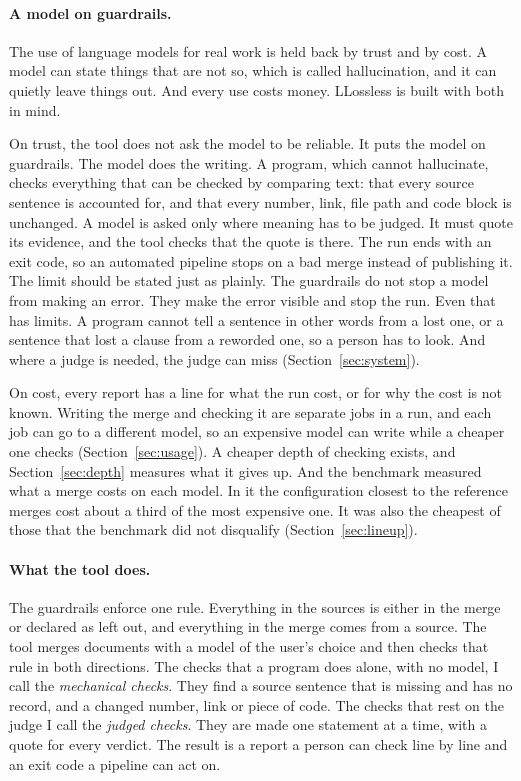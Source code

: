 \paragraph{A model on guardrails.} The use of language models for real work is held back by trust and by cost. A model can state things that are not so, which is called hallucination, and it can quietly leave things out. And every use costs money. LLossless is built with both in mind.

On trust, the tool does not ask the model to be reliable. It puts the model on guardrails. The model does the writing. A program, which cannot hallucinate, checks everything that can be checked by comparing text: that every source sentence is accounted for, and that every number, link, file path and code block is unchanged. A model is asked only where meaning has to be judged. It must quote its evidence, and the tool checks that the quote is there. The run ends with an exit code, so an automated pipeline stops on a bad merge instead of publishing it. The limit should be stated just as plainly. The guardrails do not stop a model from making an error. They make the error visible and stop the run. Even that has limits. A program cannot tell a sentence in other words from a lost one, or a sentence that lost a clause from a reworded one, so a person has to look. And where a judge is needed, the judge can miss (Section~\ref{sec:system}).

On cost, every report has a line for what the run cost, or for why the cost is not known. Writing the merge and checking it are separate jobs in a run, and each job can go to a different model, so an expensive model can write while a cheaper one checks (Section~\ref{sec:usage}). A cheaper depth of checking exists, and Section~\ref{sec:depth} measures what it gives up. And the benchmark measured what a merge costs on each model. In it the configuration closest to the reference merges cost about a third of the most expensive one. It was also the cheapest of those that the benchmark did not disqualify (Section~\ref{sec:lineup}).

\paragraph{What the tool does.} The guardrails enforce one rule. Everything in the sources is either in the merge or declared as left out, and everything in the merge comes from a source. The tool merges documents with a model of the user's choice and then checks that rule in both directions. The checks that a program does alone, with no model, I call the \emph{mechanical checks}. They find a source sentence that is missing and has no record, and a changed number, link or piece of code. The checks that rest on the judge I call the \emph{judged checks}. They are made one statement at a time, with a quote for every verdict. The result is a report a person can check line by line and an exit code a pipeline can act on.

